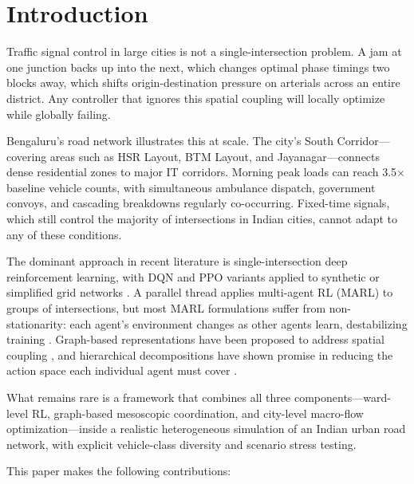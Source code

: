 \documentclass[conference]{IEEEtran}
\begin{document}
\section{Introduction}

Traffic signal control in large cities is not a single-intersection problem.
A jam at one junction backs up into the next, which changes optimal phase
timings two blocks away, which shifts origin-destination pressure on arterials
across an entire district. Any controller that ignores this spatial coupling
will locally optimize while globally failing.

Bengaluru's road network illustrates this at scale. The city's South Corridor---
covering areas such as HSR Layout, BTM Layout, and Jayanagar---connects dense
residential zones to major IT corridors. Morning peak loads can reach 3.5$\times$
baseline vehicle counts, with simultaneous ambulance dispatch, government convoys,
and cascading breakdowns regularly co-occurring. Fixed-time signals, which still
control the majority of intersections in Indian cities, cannot adapt to any of
these conditions.

The dominant approach in recent literature is single-intersection deep
reinforcement learning, with DQN and PPO variants applied to synthetic or
simplified grid networks \cite{shalaby2021intelligent, acm2021drl}. A parallel
thread applies multi-agent RL (MARL) to groups of intersections, but most MARL
formulations suffer from non-stationarity: each agent's environment changes as
other agents learn, destabilizing training \cite{marl2025sciencedirect}.
Graph-based representations have been proposed to address spatial coupling
\cite{graphbased2023arxiv}, and hierarchical decompositions have shown promise
in reducing the action space each individual agent must cover
\cite{hier2024naturereports, hier2024hierarchical}.

What remains rare is a framework that combines all three components---ward-level
RL, graph-based mesoscopic coordination, and city-level macro-flow
optimization---inside a realistic heterogeneous simulation of an Indian urban
road network, with explicit vehicle-class diversity and scenario stress testing.

This paper makes the following contributions:
\end{document}

